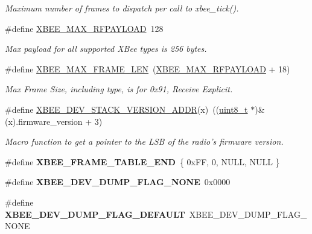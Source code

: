 \begin{DoxyCompactItemize}
\begin{DoxyCompactList}\small\item\em Maximum number of frames to dispatch per call to xbee\-\_\-tick(). \end{DoxyCompactList}\item 
\#define \hyperlink{group__xbee__device_gaea0dcde46961aae6f1cf5949be02d1a6}{X\-B\-E\-E\-\_\-\-M\-A\-X\-\_\-\-R\-F\-P\-A\-Y\-L\-O\-A\-D}~128
\begin{DoxyCompactList}\small\item\em Max payload for all supported X\-Bee types is 256 bytes. \end{DoxyCompactList}\item 
\#define \hyperlink{group__xbee__device_gad842f3c5f8d2264a99ab67a01054323a}{X\-B\-E\-E\-\_\-\-M\-A\-X\-\_\-\-F\-R\-A\-M\-E\-\_\-\-L\-E\-N}~(\hyperlink{group__xbee__device_gaea0dcde46961aae6f1cf5949be02d1a6}{X\-B\-E\-E\-\_\-\-M\-A\-X\-\_\-\-R\-F\-P\-A\-Y\-L\-O\-A\-D} + 18)
\begin{DoxyCompactList}\small\item\em Max Frame Size, including type, is for 0x91, Receive Explicit. \end{DoxyCompactList}\item 
\#define \hyperlink{group__xbee__device_ga3379d057739746b5365e74c53a5b11e9}{X\-B\-E\-E\-\_\-\-D\-E\-V\-\_\-\-S\-T\-A\-C\-K\-\_\-\-V\-E\-R\-S\-I\-O\-N\-\_\-\-A\-D\-D\-R}(x)~((\hyperlink{group__hal_gae1affc9ca37cfb624959c866a73f83c2}{uint8\-\_\-t} $\ast$)\&(x).firmware\-\_\-version + 3)
\begin{DoxyCompactList}\small\item\em Macro function to get a pointer to the L\-S\-B of the radio's firmware version. \end{DoxyCompactList}\item 
\hypertarget{group__xbee__device_gac81604781dcb36ca33af03ec44a6077a}{\#define {\bfseries X\-B\-E\-E\-\_\-\-F\-R\-A\-M\-E\-\_\-\-T\-A\-B\-L\-E\-\_\-\-E\-N\-D}~\{ 0x\-F\-F, 0, N\-U\-L\-L, N\-U\-L\-L \}}\label{group__xbee__device_gac81604781dcb36ca33af03ec44a6077a}

\item 
\hypertarget{group__xbee__device_ga3ac470bd616105be9ab7de9265c2b43b}{\#define {\bfseries X\-B\-E\-E\-\_\-\-D\-E\-V\-\_\-\-D\-U\-M\-P\-\_\-\-F\-L\-A\-G\-\_\-\-N\-O\-N\-E}~0x0000}\label{group__xbee__device_ga3ac470bd616105be9ab7de9265c2b43b}

\item 
\hypertarget{group__xbee__device_ga00403b13f32a981d18df79f31504b90a}{\#define {\bfseries X\-B\-E\-E\-\_\-\-D\-E\-V\-\_\-\-D\-U\-M\-P\-\_\-\-F\-L\-A\-G\-\_\-\-D\-E\-F\-A\-U\-L\-T}~X\-B\-E\-E\-\_\-\-D\-E\-V\-\_\-\-D\-U\-M\-P\-\_\-\-F\-L\-A\-G\-\_\-\-N\-O\-N\-E}\label{group__xbee__device_ga00403b13f32a981d18df79f31504b90a}


\end{DoxyCompactItemize}
